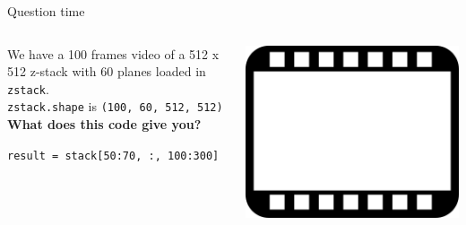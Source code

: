\documentclass[9pt, aspectratio=169]{beamer}
\begin{document}
\begin{frame}
    {Question time}
    \begin{columns}
        \begin{column}{0.7\textwidth}
            We have a 100 frames video of a 512 x 512 z-stack with 60 planes loaded in \texttt{zstack}.\\
            \texttt{zstack.shape} is \texttt{(100, 60, 512, 512)}\\
            \vspace*{2em}
            \centering
            \textbf{What does this code give you?}
            \vspace{2em}
            \begin{codebox}
                \texttt{result = stack[50:70, :, 100:300]}
            \end{codebox}
        \end{column}
        \begin{column}{0.3\textwidth}
            \includegraphics[width=.7\textwidth]{video.png}
        \end{column}
    \end{columns}
\end{frame}
\end{document}
